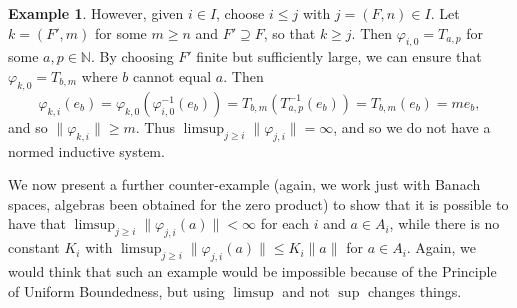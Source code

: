 \documentclass[a4paper,11pt]{article}
\theoremstyle{definition}
\newtheorem{example}[lemma]{Example}
\begin{document}
\begin{example}
However, given $i\in I$, choose $i\leq j$ with $j=(F,n)\in I$.  Let $k=(F',m)$ for some $m\geq n$
and $F'\supseteq F$, so that $k\geq j$.  Then $\varphi_{i,0} = T_{a,p}$ for some $a,p\in\mathbb N$.
By choosing $F'$ finite but sufficiently large, we can ensure that $\varphi_{k,0} = T_{b,m}$ where
$b$ cannot equal $a$.  Then
\[ \varphi_{k,i}(e_b) = \varphi_{k,0}( \varphi_{i,0}^{-1}(e_b) )
= T_{b,m}( T_{a,p}^{-1}(e_b) )
= T_{b,m}(e_b)
= m e_b, \]
and so $\|\varphi_{k,i}\|\geq m$.  Thus $\limsup_{j\geq i} \|\varphi_{j,i}\| =\infty$, and
so we do not have a normed inductive system.
\end{example}

We now present a further counter-example (again, we work just with Banach spaces, algebras been
obtained for the zero product) to show that it is possible to have that
$\limsup_{j\geq i} \|\varphi_{j,i}(a)\| < \infty$ for each $i$ and $a\in A_i$, while 
there is no constant $K_i$ with $\limsup_{j\geq i} \|\varphi_{j,i}(a)\| \leq K_i\|a\|$ for
$a\in A_i$.  Again, we would think that such an example would be impossible because of the
Principle of Uniform Boundedness, but using $\limsup$ and not $\sup$ changes things.
\end{document}
